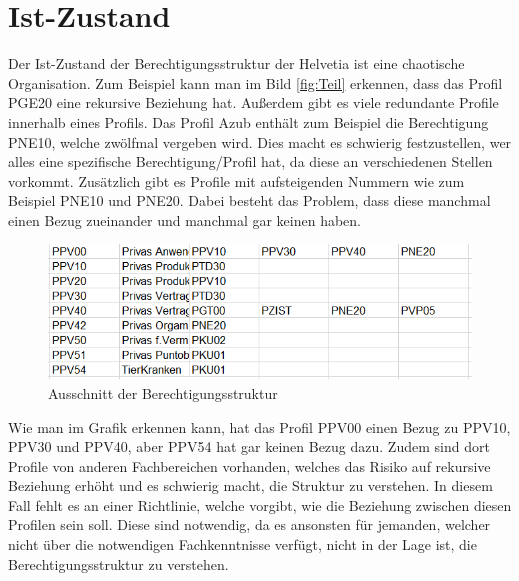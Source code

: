 \section{Ist-Zustand}
\label{sec:chapter03:Ist-Zustand}
Der Ist-Zustand der Berechtigungsstruktur der Helvetia ist eine chaotische Organisation.
Zum Beispiel kann man im Bild \ref{fig:Teil} erkennen, dass das Profil PGE20 eine rekursive Beziehung hat.
Außerdem gibt es viele redundante Profile innerhalb eines Profils.
Das Profil Azub enthält zum Beispiel die Berechtigung PNE10, welche zwölfmal vergeben wird.
Dies macht es schwierig festzustellen, wer alles eine spezifische Berechtigung/Profil hat, da diese an verschiedenen Stellen vorkommt.
\newline
Zusätzlich gibt es Profile mit aufsteigenden Nummern wie zum Beispiel PNE10 und PNE20.
Dabei besteht das Problem, dass diese manchmal einen Bezug zueinander und manchmal gar keinen haben.
\begin{figure}[h!]
 \centering
 \includegraphics[width=1\textwidth]{gfx/Picture/Beispiel.PNG}
 \caption{Ausschnitt der Berechtigungsstruktur}
 \label{fig:Profile}
\end{figure}
Wie man im Grafik erkennen kann, hat das Profil PPV00 einen Bezug zu PPV10, PPV30 und PPV40, aber PPV54 hat gar keinen Bezug dazu.
Zudem sind dort Profile von anderen Fachbereichen vorhanden, welches das Risiko auf rekursive Beziehung erhöht und es schwierig macht, die Struktur zu verstehen.
In diesem Fall fehlt es an einer Richtlinie, welche vorgibt, wie die Beziehung zwischen diesen Profilen sein soll.
Diese sind notwendig, da es ansonsten für jemanden, welcher nicht über die notwendigen Fachkenntnisse verfügt, nicht in der Lage ist, die Berechtigungsstruktur zu verstehen.